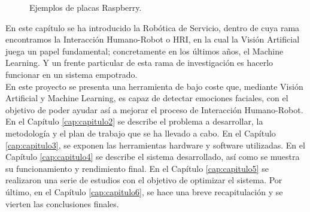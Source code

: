 \begin{figure}[h!]
  \begin{center}
    \subcapcentertrue
    \hspace{1cm}
  \end{center}
\caption{Ejemplos de placas Raspberry.}
\label{fig:raspberry_ejemplos}
\end{figure}

En este capítulo se ha introducido la Robótica de Servicio, dentro de cuya rama encontramos la Interacción Humano-Robot o HRI, en la cual la Visión Artificial juega un papel fundamental; concretamente en los últimos años, el Machine Learning. Y un frente particular de esta rama de investigación es hacerlo funcionar en un sistema empotrado.\\

En este proyecto se presenta una herramienta de bajo coste que, mediante Visión Artificial y Machine Learning, es capaz de detectar emociones faciales, con el objetivo de poder ayudar así a mejorar el proceso de Interacción Humano-Robot. En el Capítulo \ref{cap:capitulo2} se describe el problema a desarrollar, la metodología y el plan de trabajo que se ha llevado a cabo. En el Capítulo \ref{cap:capitulo3}, se exponen las herramientas hardware y software utilizadas. En el Capítulo \ref{cap:capitulo4} se describe el sistema desarrollado, así como se muestra su funcionamiento y rendimiento final. En el Capítulo \ref{cap:capitulo5} se realizaron una serie de estudios con el objetivo de optimizar el sistema. Por último, en el Capítulo \ref{cap:capitulo6}, se hace una breve recapitulación y se vierten las conclusiones finales.





